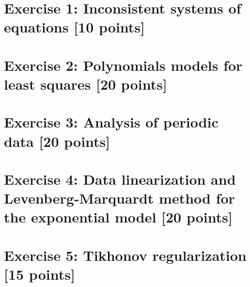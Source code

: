 \documentclass[unicode,11pt,a4paper,oneside,numbers=endperiod,openany]{scrartcl}
\begin{document}
\setassignment
{}

\newline

\assignmentpolicy


\newpage

\section*{Exercise 1: Inconsistent systems of equations [10 points]}

\section*{Exercise 2: Polynomials models for least squares [20 points]}

\section*{Exercise 3: Analysis of periodic data [20 points]}

\section*{Exercise 4: Data linearization and Levenberg-Marquardt method for the exponential model [20 points]}

\section*{Exercise 5: Tikhonov regularization [15 points]}
\end{document}
